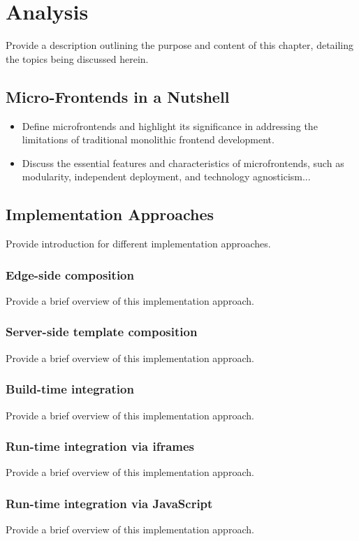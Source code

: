 \chapter{Analysis}
\label{chap:Analysis} 
Provide a description outlining the purpose and content of this chapter, detailing the topics being discussed herein.

\section{Micro-Frontends in a Nutshell}
\begin{itemize}
   \item Define microfrontends and highlight its significance in addressing the limitations of traditional monolithic frontend development.
   \item Discuss the essential features and characteristics of microfrontends, such as modularity, independent deployment, and technology agnosticism...
\end{itemize}

\section{Implementation Approaches}
Provide introduction for different implementation approaches.
\subsection{Edge-side composition}
Provide a brief overview of this implementation approach.
\subsection{Server-side template composition}
Provide a brief overview of this implementation approach.
\subsection{Build-time integration}
Provide a brief overview of this implementation approach.
\subsection{Run-time integration via iframes}
Provide a brief overview of this implementation approach.
\subsection{Run-time integration via JavaScript}
Provide a brief overview of this implementation approach.
